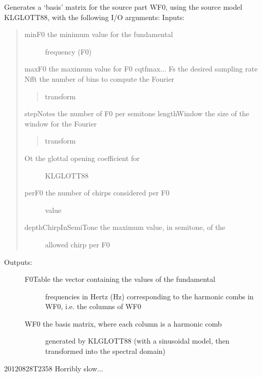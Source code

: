 \documentclass[letterpaper,10pt,english]{sphinxmanual}
\begin{document}
\begin{fulllineitems}
\label{reference/separateleadfunctions:pyfasst.SeparateLeadStereo.separateLeadFunctions.generate_WF0_TR_chirped}
Generates a `basis' matrix for the source part WF0, using the
source model KLGLOTT88, with the following I/O arguments:
Inputs:
\begin{quote}
\begin{description}
\item[{minF0                the minimum value for the fundamental}] \leavevmode
frequency (F0)

\end{description}

maxF0                the maximum value for F0
cqtfmax...
Fs                   the desired sampling rate
Nfft                 the number of bins to compute the Fourier
\begin{quote}

transform
\end{quote}

stepNotes            the number of F0 per semitone
lengthWindow         the size of the window for the Fourier
\begin{quote}

transform
\end{quote}
\begin{description}
\item[{Ot                   the glottal opening coefficient for}] \leavevmode
KLGLOTT88

\item[{perF0                the number of chirps considered per F0}] \leavevmode
value

\item[{depthChirpInSemiTone the maximum value, in semitone, of the}] \leavevmode
allowed chirp per F0

\end{description}
\end{quote}
\begin{description}
\item[{Outputs:}] \leavevmode\begin{description}
\item[{F0Table the vector containing the values of the fundamental}] \leavevmode
frequencies in Hertz (Hz) corresponding to the
harmonic combs in WF0, i.e. the columns of WF0

\item[{WF0     the basis matrix, where each column is a harmonic comb}] \leavevmode
generated by KLGLOTT88 (with a sinusoidal model, then
transformed into the spectral domain)

\end{description}

\end{description}

20120828T2358 Horribly slow...

\end{fulllineitems}
\end{document}
